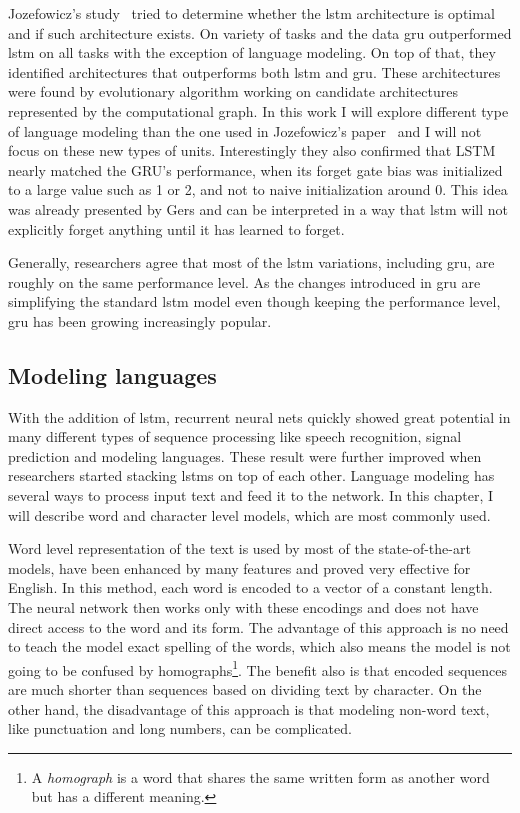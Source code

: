 Jozefowicz's study~\cite{DBLP:conf/icml/JozefowiczZS15} tried to determine whether the \gls{lstm} architecture is optimal and if such architecture exists. On variety of tasks and the data \gls{gru} outperformed \gls{lstm} on all tasks with the exception of language modeling. On top of that, they identified architectures that outperforms both \gls{lstm} and \gls{gru}. These architectures were found by evolutionary algorithm working on candidate architectures  represented by the computational graph. In this work I will explore different type of language modeling than the one used in Jozefowicz's paper~\cite{DBLP:conf/icml/JozefowiczZS15} and I will not focus on these new types of units. Interestingly they also confirmed that LSTM nearly matched the GRU's performance, when its forget gate bias was initialized to a large value such as 1 or 2, and not to naive initialization around 0. This idea was already presented by Gers \cite{DBLP:journals/neco/GersSC00} and can be interpreted in a way that \gls{lstm} will not explicitly forget anything until it has learned to forget.

Generally, researchers agree that most of the \gls{lstm} variations, including \gls{gru}, are roughly on the same performance level. As the changes introduced in \gls{gru} are simplifying the standard \gls{lstm} model even though keeping the performance level, \gls{gru} has been growing increasingly popular.

\subsection{Modeling languages}\label{subsec:languageModels}

With the addition of \gls{lstm}, recurrent neural nets quickly showed great potential in many different types of sequence processing like speech recognition, signal prediction and modeling languages. These result were further improved when researchers started stacking \gls{lstm}s on top of each other. Language modeling has several ways to process input text and feed it to the network. In this chapter, I will describe word and character level models, which are most commonly used.

Word level representation of the text is used by most of the state-of-the-art models, have been enhanced by many features and proved very effective for English. In this method, each word is encoded to a vector of a constant length. The neural network then works only with these encodings and does not have direct access to the word and its form. The advantage of this approach is no need to teach the model exact spelling of the words, which also means the model is not going to be confused by homographs\footnote{A \emph{homograph} is a word that shares the same written form as another word but has a different meaning.}. The benefit also is that encoded sequences are much shorter than sequences based on dividing text by character. On the other hand, the disadvantage of this approach is that modeling non-word text, like punctuation and long numbers, can be complicated.

